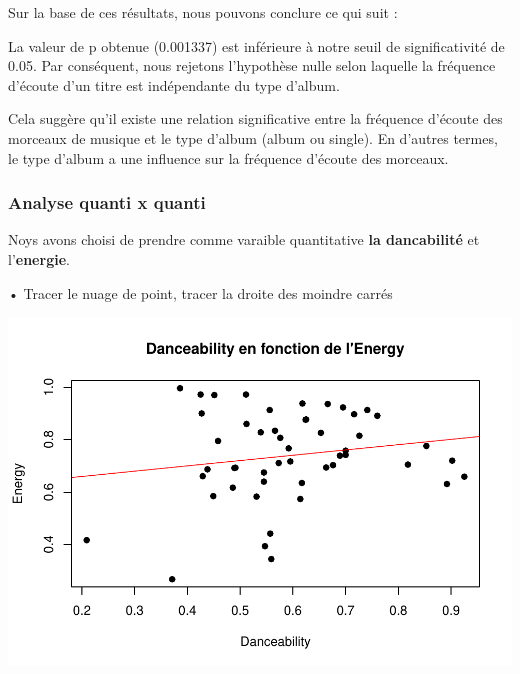 \documentclass[
]{article}
\newenvironment{Shaded}{\begin{snugshade}}{\end{snugshade}}
\newcommand{\AttributeTok}[1]{\textcolor[rgb]{0.77,0.63,0.00}{#1}}
\newcommand{\CommentTok}[1]{\textcolor[rgb]{0.56,0.35,0.01}{\textit{#1}}}
\newcommand{\DecValTok}[1]{\textcolor[rgb]{0.00,0.00,0.81}{#1}}
\newcommand{\FunctionTok}[1]{\textcolor[rgb]{0.00,0.00,0.00}{#1}}
\newcommand{\NormalTok}[1]{#1}
\newcommand{\SpecialCharTok}[1]{\textcolor[rgb]{0.00,0.00,0.00}{#1}}
\newcommand{\StringTok}[1]{\textcolor[rgb]{0.31,0.60,0.02}{#1}}
\begin{document}
Sur la base de ces résultats, nous pouvons conclure ce qui suit :

La valeur de p obtenue (0.001337) est inférieure à notre seuil de
significativité de 0.05. Par conséquent, nous rejetons l'hypothèse nulle
selon laquelle la fréquence d'écoute d'un titre est indépendante du type
d'album.

Cela suggère qu'il existe une relation significative entre la fréquence
d'écoute des morceaux de musique et le type d'album (album ou single).
En d'autres termes, le type d'album a une influence sur la fréquence
d'écoute des morceaux.

\hypertarget{analyse-quanti-x-quanti}{%
\subsubsection{Analyse quanti x quanti}\label{analyse-quanti-x-quanti}}

Noys avons choisi de prendre comme varaible quantitative \textbf{la
dancabilité} et l'\textbf{energie}.

• Tracer le nuage de point, tracer la droite des moindre carrés

\begin{Shaded}
\end{Shaded}

\includegraphics{spotify_analysis_files/figure-latex/unnamed-chunk-17-1.pdf}
\end{document}
